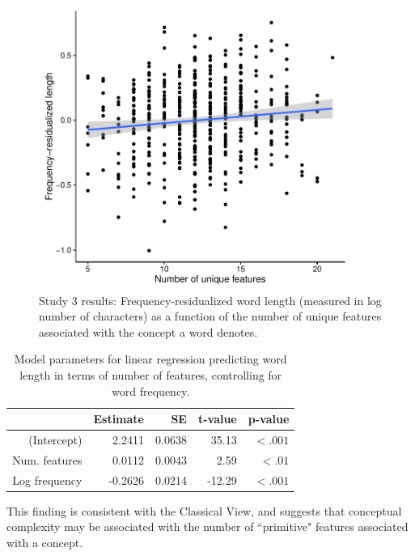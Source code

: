   \begin{figure}
 \begin{center}
  \includegraphics[width=4in]{figs/feature_plot.pdf}
  \caption{\label{fig:feature_plot} Study 3 results: Frequency-residualized word length (measured in log number of characters) as a function of the number of unique features associated with the concept a word denotes. }
 \end{center}
\end{figure}

\begin{table}[t!]
\centering
\begin{tabular}{rrrrr}
  \hline
 & Estimate & SE & t-value & p-value \\ 
  \hline
(Intercept) & 2.2411 & 0.0638 & 35.13 & $<.001$ \\ 
  Num. features & 0.0112 & 0.0043 & 2.59 & $<.01$\\ 
  Log frequency & -0.2626 & 0.0214 & -12.29 & $<.001$  \\ 
   \hline
\end{tabular}
\caption{Model parameters for linear regression predicting word length in terms of number of features, controlling for word frequency.}
\label{study3amodel}
\end{table}

This finding is consistent with the Classical View, and suggests that conceptual complexity may be associated with the number of ``primitive" features associated with a concept.

